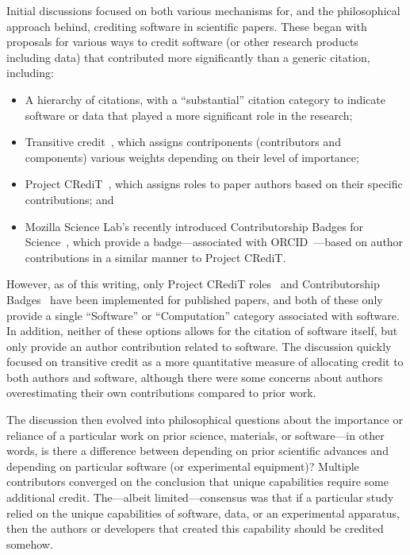 Initial discussions focused on both various mechanisms for, and the
philosophical approach behind, crediting software in scientific papers. These
began with proposals for various ways to credit software (or other research
products including data) that contributed more significantly than a generic
citation, including:
\begin{itemize}

\item A hierarchy of citations, with a ``substantial'' citation category to
indicate software or data that played a more significant role in the research;

\item Transitive credit~\cite{wssspe2_katz,Katz:2014_tc}, which assigns
contriponents (contributors and components) various weights depending on their
level of importance;
    
\item Project CRediT~\cite{projectcredit}, which assigns roles to paper authors
based on their specific contributions; and
    
\item Mozilla Science Lab's recently introduced Contributorship Badges for
Science~\cite{Mozilla_badges}, which provide a badge---associated with
ORCID~\cite{orcid}---based on author contributions in a similar manner to
Project CRediT.
    
\end{itemize}
However, as of this writing, only Project CRediT
roles~\cite{McCall2015_credit,Lin2015_credit} and Contributorship
Badges~\cite{Mozilla_badges} have been implemented for published papers, and
both of these only provide a single ``Software'' or ``Computation'' category
associated with software. In addition, neither of these options allows for the
citation of software itself, but only provide an author contribution related to
software. The discussion quickly focused on transitive credit as a more
quantitative measure of allocating credit to both authors and software, although
there were some concerns about authors overestimating their own contributions
compared to prior work.

The discussion then evolved into philosophical questions about the importance or
reliance of a particular work on prior science, materials, or software---in
other words, is there a difference between depending on prior scientific
advances and depending on particular software (or experimental equipment)?
Multiple contributors converged on the conclusion that unique capabilities
require some additional credit. The---albeit limited---consensus was that if a
particular study relied on the unique capabilities of software, data, or an
experimental apparatus, then the authors or developers that created this
capability should be credited somehow.

